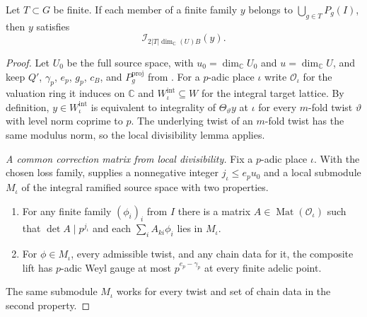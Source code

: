 \begin{theorem}
\label{thm:index-bound}
\emitthmsource
Let $T\subset G$ be finite. If each member of a finite family $y$ belongs to $\bigcup_{g\in T}P_g(I)$, then $y$ satisfies
\begin{equation}
  \mathcal I_{2|T|\dim_{\mathbb C}(U)B}(y).
\label{eq:a-index}
\end{equation}
\end{theorem}
\begin{proof}
Let $U_0$ be the full source space, with $u_0=\dim_{\mathbb C}U_0$ and $u=\dim_{\mathbb C}U$, and keep $Q'$, $\gamma_p$, $e_p$, $g_p$, $c_B$, and $P_g^{\mathrm{proj}}$ from . For a $p$-adic place $\iota$ write $\mathcal O_\iota$ for the valuation ring it induces on $\mathbb C$ and $W_{\iota}^{\mathrm{int}}\subseteq W$ for the integral target lattice. By definition, $y\in W_{\iota}^{\mathrm{int}}$ is equivalent to integrality of $\Theta_\vartheta y$ at $\iota$ for every $m$-fold twist $\vartheta$ with level norm coprime to $p$. The underlying twist of an $m$-fold twist has the same modulus norm, so the local divisibility lemma applies.

\emph{A common correction matrix from local divisibility.}
Fix a $p$-adic place $\iota$. With the chosen loss family,  supplies a nonnegative integer $j_\iota\le e_pu_0$ and a local submodule $M_\iota$ of the integral ramified source space with two properties.
\begin{enumerate}
\item For any finite family $(\phi_i)_i$ from $I$ there is a matrix $A\in\operatorname{Mat}(\mathcal O_\iota)$ such that
$\det A\mid p^{j_\iota}$ and each $\sum_i A_{ki}\phi_i$ lies in $M_\iota$.
\item For $\phi\in M_\iota$, every admissible twist, and any chain data for it, the composite lift has $p$-adic Weyl gauge at most $p^{e_p-\gamma_p}$ at every finite adelic point.
\end{enumerate}
The same submodule $M_\iota$ works for every twist and set of chain data in the second property.


\end{proof}
